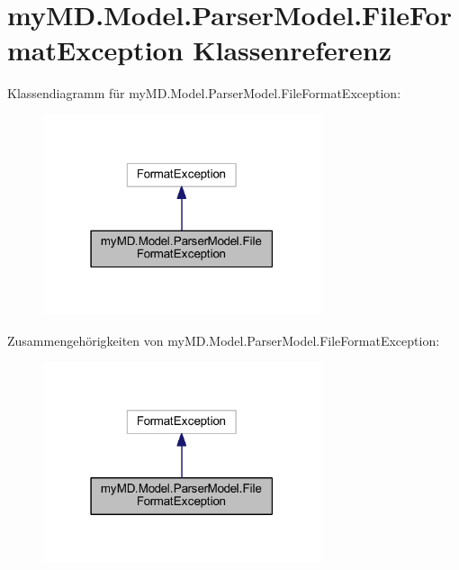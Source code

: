 \hypertarget{classmy_m_d_1_1_model_1_1_parser_model_1_1_file_format_exception}{}\section{my\+M\+D.\+Model.\+Parser\+Model.\+File\+Format\+Exception Klassenreferenz}
\label{classmy_m_d_1_1_model_1_1_parser_model_1_1_file_format_exception}


Klassendiagramm für my\+M\+D.\+Model.\+Parser\+Model.\+File\+Format\+Exception\+:
\nopagebreak
\begin{figure}[H]
\begin{center}
\leavevmode
\includegraphics[width=231pt]{classmy_m_d_1_1_model_1_1_parser_model_1_1_file_format_exception__inherit__graph}
\end{center}
\end{figure}


Zusammengehörigkeiten von my\+M\+D.\+Model.\+Parser\+Model.\+File\+Format\+Exception\+:
\nopagebreak
\begin{figure}[H]
\begin{center}
\leavevmode
\includegraphics[width=231pt]{classmy_m_d_1_1_model_1_1_parser_model_1_1_file_format_exception__coll__graph}
\end{center}
\end{figure}
